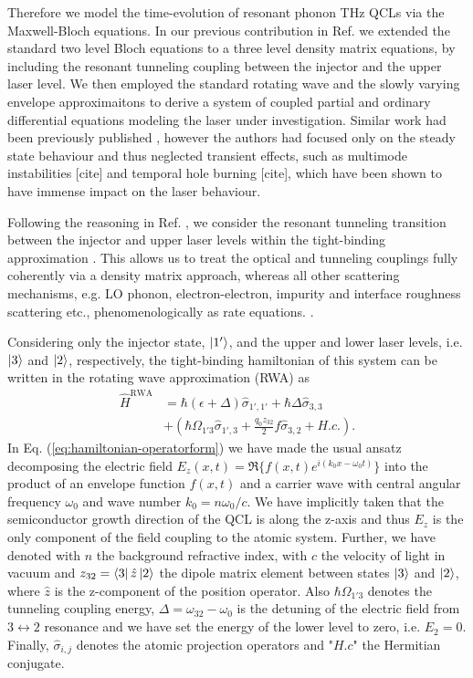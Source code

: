 \documentclass[journal]{IEEEtran}
\def\h{\hat}
\begin{document}
Therefore we model the time-evolution of resonant phonon THz QCLs via the Maxwell-Bloch equations. In our previous contribution in Ref. \cite{petz2016} we extended the standard two level Bloch equations to a three level density matrix equations, by including the resonant tunneling coupling between the injector and the upper laser level. We then employed the standard rotating wave and the slowly varying envelope approximaitons to derive a system of coupled partial and ordinary differential equations modeling the laser under investigation. Similar work had been previously published \cite{callebaut2005importance,kumar2009coherence,dupont2010simplified}, however the authors had focused only on the steady state behaviour and thus neglected transient effects, such as multimode instabilities [cite] and temporal hole burning [cite], which have been shown to have immense impact on the laser behaviour. 

Following the reasoning in Ref. \cite{callebaut2005importance}, we consider the resonant tunneling transition between the injector and upper laser levels within the tight-binding approximation \cite{bastardwave}.  This allows us to treat the optical and tunneling couplings fully coherently via a density matrix approach, whereas all other scattering mechanisms, e.g. LO phonon, electron-electron, impurity and interface roughness scattering etc., phenomenologically as rate equations. \cite{kumar2009coherence}. 

Considering only the injector state, $\ket{1'}$, and the upper and lower laser levels, i.e. $\ket{3}$ and $\ket{2}$, respectively, the tight-binding hamiltonian of this system can be written in the rotating wave approximation (RWA) as
 	\begin{align}
	\label{eq:hamiltonian-operatorform}
	\h{H}^{\text{RWA}} &= \hbar(\epsilon + \Delta) \h\sigma_{1',1'} +\hbar\Delta\h\sigma_{3,3}  \nonumber \\ &+ (\hbar\Omega_{1'3}\h\sigma_{1',3} +\frac{q_0z_{32}}{2}f \h\sigma_{3,2}+H.c.).
	\end{align}
	In Eq. (\ref{eq:hamiltonian-operatorform}) we have made the usual ansatz decomposing the electric field $E_z(x,t) = \Re\{f(x,t) e^{i(k_0x-\omega_0t)}\}$ into the product of an envelope function $f(x,t)$ and a carrier wave with central angular frequency $\omega_0$ and wave number $k_0 = n\omega_0/c$. We have implicitly taken that the semiconductor growth direction of the QCL is along the z-axis and thus $E_z$ is the only component of the field coupling to the atomic system. Further, we have denoted with $n$ the background refractive index, with $c$ the velocity of light in vacuum and $z_{32} = \bra{3}\h{z}\ket{2} $ the dipole matrix element between states $\ket{3}$ and $\ket{2}$, where $\h{z}$ is the z-component of the position operator. Also $\hbar\Omega_{1'3}$ denotes the tunneling coupling energy, $\Delta = \omega_{32} -\omega_0$ is the detuning of the electric field from $3\leftrightarrow 2$ resonance and we have set the energy of the lower level to zero, i.e. $E_2 = 0$. Finally, $\h \sigma_{i,j}$ denotes the atomic projection operators and "$H.c$" the Hermitian conjugate.
\end{document}
